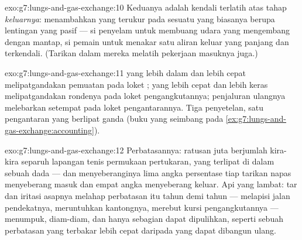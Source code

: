 \begin{solution}{exo:g7:lungs-and-gas-exchange:10}
Keduanya adalah kendali terlatih atas tahap \emph{keluarnya}:
menambahkan  yang terukur pada sesuatu yang biasanya berupa
lentingan yang pasif --- si penyelam untuk membuang udara yang
mengembang dengan mantap, si pemain untuk menakar satu aliran keluar
yang panjang dan terkendali. (Tarikan dalam mereka melatih pekerjaan
masuknya juga.)
\end{solution}

\begin{solution}{exo:g7:lungs-and-gas-exchange:11}
 yang lebih dalam dan lebih cepat melipatgandakan pemuatan
pada loket ;  yang lebih cepat dan lebih keras
melipatgandakan rondenya pada loket pengangkutannya; penjaluran
ulangnya melebarkan  setempat  pada loket
pengantarannya. Tiga penyetelan, satu pengantaran yang berlipat ganda
(buku yang seimbang pada
\cref{ex:g7:lungs-and-gas-exchange:accounting}).
\end{solution}

\begin{solution}{exo:g7:lungs-and-gas-exchange:12}
Perbatasannya: ratusan juta  berjumlah kira-kira separuh
lapangan tenis permukaan pertukaran, yang terlipat di dalam sebuah
dada --- dan menyeberanginya lima angka persentase  tiap
tarikan napas menyeberang masuk dan empat angka 
menyeberang keluar. Api yang lambat: tar dan iritasi asapnya melahap
perbatasan itu tahun demi tahun --- melapisi jalan pendekatnya,
meruntuhkan kantongnya, merebut kursi pengangkutannya --- menumpuk,
diam-diam, dan hanya sebagian dapat dipulihkan, seperti sebuah
perbatasan yang terbakar lebih cepat daripada yang dapat dibangun
ulang.
\end{solution}

